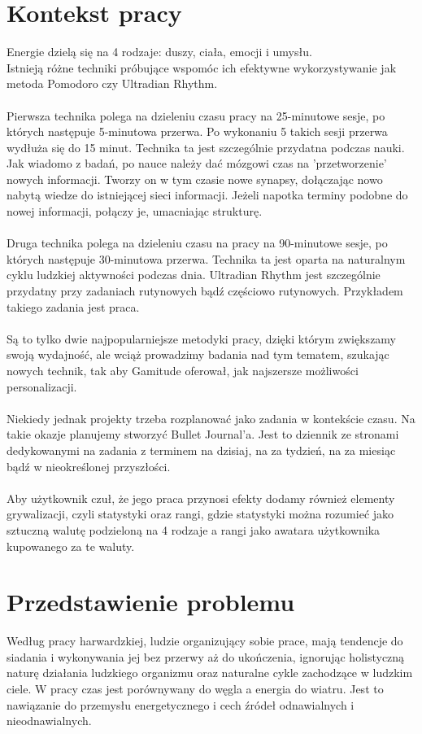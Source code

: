 \documentclass[a4paper,11pt]{report}
\begin{document}
\section{Kontekst pracy}
Energie\cite{Harward} dzielą się na 4 rodzaje: duszy, ciała, emocji i umysłu.
\\Istnieją różne techniki próbujące wspomóc ich efektywne wykorzystywanie jak metoda Pomodoro\cite{Pomodoro} czy Ultradian Rhythm\cite{90/30}.
\\\\Pierwsza technika polega na dzieleniu czasu pracy na 25-minutowe sesje, po których następuje 5-minutowa przerwa.
 Po wykonaniu 5 takich sesji przerwa wydłuża się do 15 minut.
 Technika ta jest szczególnie przydatna podczas nauki.
\\Jak wiadomo z badań, po nauce należy dać mózgowi czas na 'przetworzenie' nowych informacji.
 Tworzy on w tym czasie nowe synapsy, dołączając nowo nabytą wiedze do istniejącej sieci informacji.
 Jeżeli napotka terminy podobne do nowej informacji, połączy je,  umacniając strukturę. 
\\\\Druga technika polega na dzieleniu czasu na pracy na 90-minutowe sesje, po których następuje 30-minutowa przerwa.
 Technika ta jest oparta na naturalnym cyklu ludzkiej aktywności podczas dnia.
 Ultradian Rhythm jest szczególnie przydatny przy zadaniach rutynowych bądź częściowo rutynowych.
 Przykładem takiego zadania jest praca.
\\\\Są to tylko dwie najpopularniejsze metodyki pracy, dzięki którym zwiększamy swoją wydajność,
 ale wciąż prowadzimy badania nad tym tematem, szukając nowych technik,
 tak aby Gamitude oferował, jak najszersze możliwości personalizacji. 
\\\\Niekiedy jednak projekty trzeba rozplanować jako zadania w kontekście czasu.
 Na takie okazje planujemy stworzyć Bullet Journal\cite{bullet}'a.
 Jest to dziennik ze stronami dedykowanymi na zadania z terminem na dzisiaj,
  na za tydzień, na za miesiąc bądź w nieokreślonej przyszłości.
\\\\Aby użytkownik czuł, że jego praca przynosi efekty dodamy również elementy grywalizacji\cite{grywalizacja}, czyli 
 statystyki oraz rangi\cite{rangi}, gdzie statystyki można rozumieć jako sztuczną walutę podzieloną na 4 rodzaje a rangi 
 jako awatara użytkownika kupowanego za te waluty.
\section{Przedstawienie problemu}
Według pracy harwardzkiej, ludzie organizujący sobie prace, mają tendencje do siadania i wykonywania jej bez przerwy aż do ukończenia,
 ignorując holistyczną naturę działania ludzkiego organizmu oraz naturalne cykle zachodzące w ludzkim ciele.
 W pracy czas jest porównywany do węgla a energia do wiatru.
 Jest to nawiązanie do przemysłu energetycznego i cech źródeł odnawialnych i nieodnawialnych.
\end{document}
